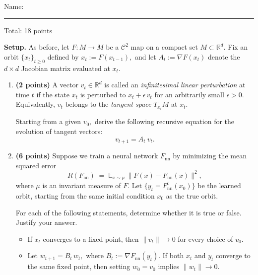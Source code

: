 \documentclass[12pt]{article}
\begin{document}
\begin{center}
Name: \rule{3in}{0.4pt} \hfill Total: 18 points
\end{center}

\medskip
\noindent
\textbf{Setup.}\; As before, let $F: M \to M$ be a $\mathcal{C}^2$ map on a compact set $M \subset \mathbb{R}^d.$
Fix an orbit $\{x_t\}_{t\geq 0}$ defined by $x_t := F(x_{t-1}),$ and let $A_t := \nabla F(x_t)$ denote the $d\times d$ Jacobian matrix evaluated at $x_t.$

\begin{enumerate}

    \item \textbf{(2 points)} A vector $v_t \in \mathbb{R}^d$ is called an \emph{infinitesimal linear perturbation} at time $t$ if the state $x_t$ is perturbed to $x_t + \epsilon\, v_t$ for an arbitrarily small $\epsilon > 0.$ Equivalently, $v_t$ belongs to the \emph{tangent space} $T_{x_t} M$ at $x_t.$

    Starting from a given $v_0,$ derive the following recursive equation for the evolution of tangent vectors:
    \begin{equation}
            v_{t+1} = A_t \: v_t.
    \end{equation}

    \vspace{3in}

    \newpage

    \item \textbf{(6 points)} Suppose we train a neural network $F_\mathrm{nn}$ by minimizing the mean squared error
    \[
        R(F_\mathrm{nn}) \;=\; \mathbb{E}_{x \sim \mu}\, \|F(x) - F_\mathrm{nn}(x)\|^2,
    \]
    where $\mu$ is an invariant measure of $F.$ Let $\{y_t = F_\mathrm{nn}^t(x_0)\}$ be the learned orbit, starting from the same initial condition $x_0$ as the true orbit.

    For each of the following statements, determine whether it is true or false. Justify your answer.
    \begin{itemize}
        \item[(a)] If $x_t$ converges to a fixed point, then $\|v_t\| \to 0$ for every choice of $v_0$.

        \vspace{1.5in}

        \item[(b)] Let $w_{t+1} = B_t\, w_t,$ where $B_t := \nabla F_\mathrm{nn}(y_t).$ If both $x_t$ and $y_t$ converge to the same fixed point, then setting $w_0 = v_0$ implies $\|w_t\| \to 0.$


\end{itemize}
\end{enumerate}
\end{document}
